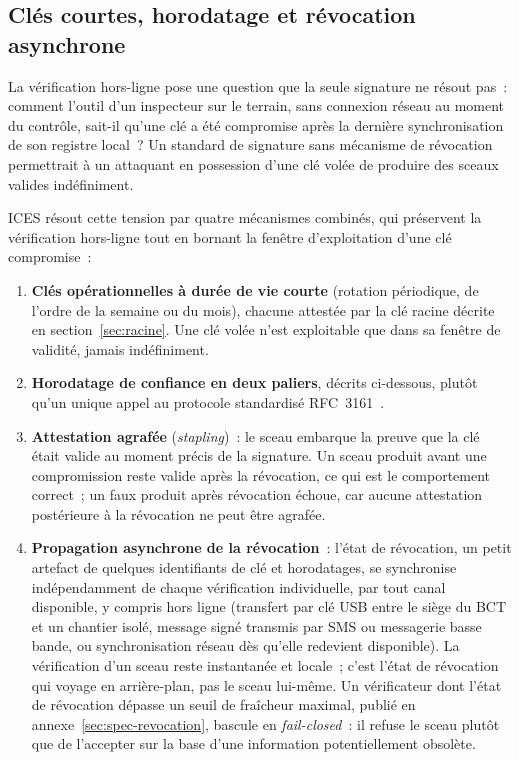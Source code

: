 \documentclass[11pt,a4paper]{article}
\begin{document}
\subsection{Clés courtes, horodatage et révocation asynchrone}\label{sec:cles}

La vérification hors-ligne pose une question que la seule signature ne résout pas~: comment l'outil d'un inspecteur sur le terrain, sans connexion réseau au moment du contrôle, sait-il qu'une clé a été compromise après la dernière synchronisation de son registre local~? Un standard de signature sans mécanisme de révocation permettrait à un attaquant en possession d'une clé volée de produire des sceaux valides indéfiniment.

ICES résout cette tension par quatre mécanismes combinés, qui préservent la vérification hors-ligne tout en bornant la fenêtre d'exploitation d'une clé compromise~:

\begin{enumerate}[leftmargin=1.4em, itemsep=2pt]
  \item \textbf{Clés opérationnelles à durée de vie courte} (rotation périodique, de l'ordre de la semaine ou du mois), chacune attestée par la clé racine décrite en section~\ref{sec:racine}. Une clé volée n'est exploitable que dans sa fenêtre de validité, jamais indéfiniment.
  \item \textbf{Horodatage de confiance en deux paliers}, décrits ci-dessous, plutôt qu'un unique appel au protocole standardisé RFC~3161~\cite{rfc3161}.
  \item \textbf{Attestation agrafée} (\emph{stapling})~: le sceau embarque la preuve que la clé était valide au moment précis de la signature. Un sceau produit avant une compromission reste valide après la révocation, ce qui est le comportement correct~; un faux produit après révocation échoue, car aucune attestation postérieure à la révocation ne peut être agrafée.
  \item \textbf{Propagation asynchrone de la révocation}~: l'état de révocation, un petit artefact de quelques identifiants de clé et horodatages, se synchronise indépendamment de chaque vérification individuelle, par tout canal disponible, y compris hors ligne (transfert par clé USB entre le siège du BCT et un chantier isolé, message signé transmis par SMS ou messagerie basse bande, ou synchronisation réseau dès qu'elle redevient disponible). La vérification d'un sceau reste instantanée et locale~; c'est l'état de révocation qui voyage en arrière-plan, pas le sceau lui-même. Un vérificateur dont l'état de révocation dépasse un seuil de fraîcheur maximal, publié en annexe~\ref{sec:spec-revocation}, bascule en \emph{fail-closed}~: il refuse le sceau plutôt que de l'accepter sur la base d'une information potentiellement obsolète.
\end{enumerate}
\end{document}

